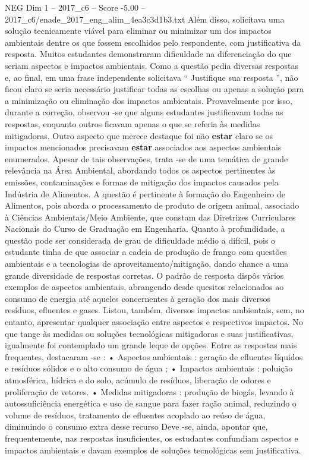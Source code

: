 \begin{textsample}{NEG Dim 1 – 2017\_c6 – Score -5.00 – 2017\_c6/enade\_2017\_eng\_alim\_4ea3c3d1b3.txt}
Além disso, solicitava uma solução tecnicamente viável para eliminar ou minimizar um dos impactos ambientais dentre os que fossem escolhidos pelo respondente, com justificativa da resposta.
Muitos estudantes demonstraram dificuldade na diferenciação do que seriam aspectos e impactos ambientais.
Como a questão pedia diversas respostas e, ao final, em uma frase independente solicitava “ Justifique sua resposta ”, não ficou claro se seria necessário justificar todas as escolhas ou apenas a solução para a minimização ou eliminação dos impactos ambientais.
Provavelmente por isso, durante a correção, observou -se que alguns estudantes justificavam todas as respostas, enquanto outros ficavam apenas o que se referia às medidas mitigadoras.
Outro aspecto que merece destaque foi não \textbf{estar} claro se os impactos mencionados precisavam \textbf{estar} associados aos aspectos ambientais enumerados.
Apesar de tais observações, trata -se de uma temática de grande relevância na Área Ambiental, abordando todos os aspectos pertinentes às emissões, contaminações e formas de mitigação dos impactos causados pela Indústria de Alimentos.
A questão é pertinente à formação do Engenheiro de Alimentos, pois aborda o processamento de produto de origem animal, associado à Ciências Ambientais/Meio Ambiente, que constam das Diretrizes Curriculares Nacionais do Curso de Graduação em Engenharia.
Quanto à profundidade, a questão pode ser considerada de grau de dificuldade médio a difícil, pois o estudante tinha de que associar a cadeia de produção de frango com questões ambientais e a tecnologias de aproveitamento/mitigação, dando chance a uma grande diversidade de respostas corretas.
O padrão de resposta dispôs vários exemplos de aspectos ambientais, abrangendo desde quesitos relacionados ao consumo de energia até aqueles concernentes à geração dos mais diversos resíduos, efluentes e gases.
Listou, também, diversos impactos ambientais, sem, no entanto, apresentar qualquer associação entre aspectos e respectivos impactos.
No que tange às medidas ou soluções tecnológicas mitigadoras e suas justificativas, igualmente foi contemplado um grande leque de opções.
Entre as respostas mais frequentes, destacaram -se : • Aspectos ambientais : geração de efluentes líquidos e resíduos sólidos e o alto consumo de água ; • Impactos ambientais : poluição atmosférica, hídrica e do solo, acúmulo de resíduos, liberação de odores e proliferação de vetores. • Medidas mitigadoras : produção de biogás, levando à autossuficiência energética e uso de sangue para fazer ração animal, reduzindo o volume de resíduos, tratamento de efluentes acoplado ao reúso de água, diminuindo o consumo extra desse recurso Deve -se, ainda, apontar que, frequentemente, nas respostas insuficientes, os estudantes confundiam aspectos e impactos ambientais e davam exemplos de soluções tecnológicas sem justificativa.

\end{textsample}
